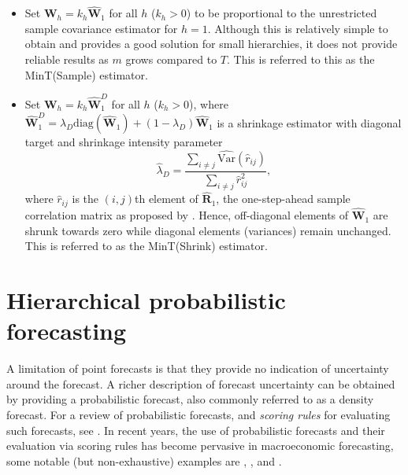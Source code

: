 \documentclass[graybox]{svmult}
\begin{document}
\begin{itemize}
	\item Set $\bm{W}_{h}=k_{h}\hat{\bm{W}}_{1}$ for all $h$ ($k_{h} > 0$) to be proportional to the unrestricted sample covariance estimator for $h=1$. Although this is relatively simple to obtain and provides a good solution for small hierarchies, it does not provide reliable results as $m$ grows compared to $T$. This is referred to this as the MinT(Sample) estimator.

	\item Set $\bm{W}_{h}=k_{h}\hat{\bm{W}}_{1}^D$ for all $h$ ($k_{h} > 0$), where $\hat{\bm{W}}^{D}_{1} = \lambda_{D} \text{diag}(\hat{\bm{W}}_{1}) + (1 - \lambda_{D})\hat{\bm{W}}_{1}$ is a shrinkage estimator with diagonal target and shrinkage intensity parameter
  $$
    \hat{\lambda}_{D} = \frac{\sum_{i \ne j}\hat{\text{Var}}(\hat{r}_{ij})}{\sum_{i \ne j}\hat{r}_{ij}^2},
  $$
	where $\hat{r}_{ij}$ is the $(i,j)$th element of $\hat{\bm{R}}_{1}$, the one-step-ahead sample correlation matrix as proposed by \citet{Schafer2005}. Hence, off-diagonal elements of $\hat{\bm{W}}_1$ are shrunk towards zero while diagonal elements (variances) remain unchanged. This is referred to as the MinT(Shrink) estimator.
\end{itemize}

\section{Hierarchical probabilistic forecasting}\label{sec:probforecasting}

A limitation of point forecasts is that they provide no indication of uncertainty around the forecast. A richer description of forecast uncertainty can be obtained by providing a probabilistic forecast, also commonly referred to as a density forecast. For a review of probabilistic forecasts, and \emph{scoring rules} for evaluating such forecasts, see \citep{Gneiting2014}. In recent years, the use of probabilistic forecasts and their evaluation via scoring rules has become pervasive in macroeconomic forecasting, some notable (but non-exhaustive) examples are \citet{GewAmi2010}, \citet{BilEtAl2013}, \citet{CarEtAl2015} and \citet{ClaRav2015}.

\end{document}
